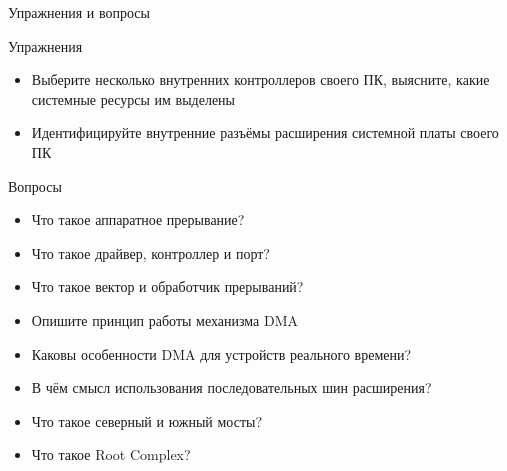 \documentclass[xetex,aspectratio=43]{beamer}
\begin{document}
\begin{frame}{Упражнения и вопросы}
	\begin{block}{Упражнения}
		\begin{itemize}
			\tightlist
			\item
			Выберите несколько внутренних контроллеров своего ПК, выясните, какие
			системные ресурсы им выделены
            \item
            Идентифицируйте внутренние разъёмы расширения системной платы своего ПК
		\end{itemize}
	\end{block}

	\begin{block}{Вопросы}
		\begin{itemize}
			\tightlist
			\item
			Что такое аппаратное прерывание?
			\item
			Что такое драйвер, контроллер и порт?
			\item
			Что такое вектор и обработчик прерываний?
			\item
			Опишите принцип работы механизма DMA
			\item
			Каковы особенности DMA для устройств реального времени?
            \item
            В чём смысл использования последовательных шин расширения?
            \item
            Что такое северный и южный мосты?
            \item
            Что такое Root Complex?
		\end{itemize}
	\end{block}
\end{frame}

\postamble
\end{document}
